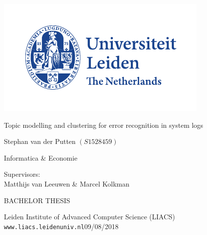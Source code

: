 \thispagestyle{empty}

\includegraphics{logoleiden}


\vspace{-2.5cm}\hfill {}

\vspace{3cm}
\begin{Large}
\hfill Topic modelling and clustering for error recognition in system logs


\vspace*{14mm}

\hfill Stephan van der Putten $(S1528459)$ 
\begin{flushright} Informatica \& Economie \end{flushright}
\end{Large}


\begin{large}

\vspace{2.8cm}
Supervisors:\\
Matthijs van Leeuwen \& Marcel Kolkman


\vspace*{2.8cm}

BACHELOR THESIS

\vspace*{5mm}
Leiden Institute of Advanced Computer Science (LIACS)\\
\texttt{www.liacs.leidenuniv.nl}\hfill 09/08/2018
\end{large}

